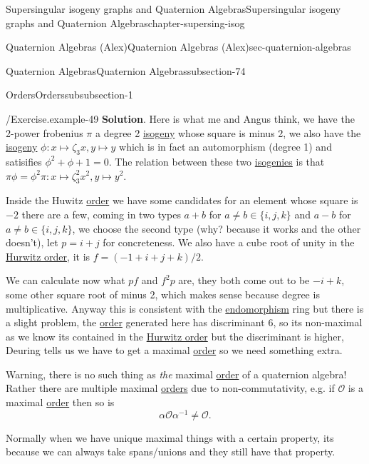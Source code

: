 \documentclass[oneside,10pt,]{book}
\numberwithin{equation}{section}
\newcommand{\inv}{^{-1}}
\newcommand{\ints}{\mathcal{O}}
\begin{document}
\begin{chapterptx}{Supersingular isogeny graphs and Quaternion Algebras}{}{Supersingular isogeny graphs and Quaternion Algebras}{}{}{chapter-supersing-isog}
\begin{sectionptx}{Quaternion Algebras (Alex)}{}{Quaternion Algebras (Alex)}{}{}{sec-quaternion-algebras}
\begin{subsectionptx}{Quaternion Algebras}{}{Quaternion Algebras}{}{}{subsection-74}
\begin{subsubsectionptx}{Orders}{}{Orders}{}{}{subsubsection-1}
\begin{example}{/Exercise.}{example-49}
\noindent\textbf{Solution}.\hypertarget{solution-1}{}\quad%
\hypertarget{p-912}{}%
Here is what me and Angus think, we have the 2-power frobenius \(\pi\) a degree 2 \hyperref[def-supersing-isog-isog]{isogeny} whose square is minus 2, we also have the \hyperref[def-supersing-isog-isog]{isogeny} \(\phi \colon x\mapsto \zeta_3 x, y\mapsto y\) which is in fact an automorphism (degree 1) and satisifies \(\phi^2 + \phi + 1 = 0\). The relation between these two \hyperref[def-supersing-isog-isog]{isogenies} is that \(\pi \phi  = \phi^2 \pi \colon x\mapsto \zeta_3^2 x^2, y\mapsto y^2\).%
\par
\hypertarget{p-913}{}%
Inside the Huwitz \hyperref[def-order-quaternion]{order} we have some candidates for an element whose square is \(-2\) there are a few, coming in two types \(a+ b\) for \(a \ne b \in \{i,j,k\}\) and \(a-b\) for \(a\ne b\in \{i,j,k\}\), we choose the second type (why? because it works and the other doesn't), let \(p = i + j\) for concreteness. We also have a cube root of unity in the \hyperref[ex-hurwitz-order]{Hurwitz order}, it is \(f = (-1 + i + j + k)/2\).%
\par
\hypertarget{p-914}{}%
We can calculate now what \(pf\) and \(f^2 p\) are, they both come out to be \(- i + k\), some other square root of minus 2, which makes sense because degree is multiplicative. Anyway this is consistent with the \hyperref[def-supersing-isog-endo]{endomorphism} ring but there is a slight problem, the \hyperref[def-order-quaternion]{order} generated here has discriminant \(6\), so its non-maximal as we know its contained in the \hyperref[ex-hurwitz-order]{Hurwitz order} but the discriminant is higher, Deuring tells us we have to get a maximal \hyperref[def-order-quaternion]{order} so we need something extra.%
\end{example}
\hypertarget{p-915}{}%
Warning, there is no such thing as \emph{the} maximal \hyperref[def-order-quaternion]{order} of a quaternion algebra! Rather there are multiple maximal \hyperref[def-order-quaternion]{orders} due to non-commutativity, e.g. if \(\ints\) is a maximal \hyperref[def-order-quaternion]{order} then so is%
\begin{equation*}
\alpha \ints \alpha\inv \ne \ints\text{.}
\end{equation*}
%
\par
\hypertarget{p-916}{}%
Normally when we have unique maximal things with a certain property, its because we can always take spans/unions and they still have that property.%
\par
\hypertarget{p-917}{}%

\end{subsubsectionptx}
\end{subsectionptx}
\end{sectionptx}
\end{chapterptx}
\end{document}
